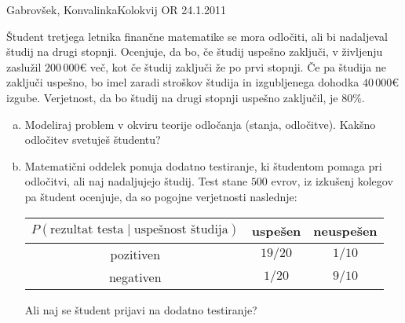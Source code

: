 \begin{naloga}{Gabrovšek, Konvalinka}{Kolokvij OR 24.1.2011}
\begin{vprasanje}
Študent tretjega letnika finančne matematike se mora odločiti,
ali bi nadaljeval študij na drugi stopnji.
Ocenjuje, da bo, če študij uspešno zaključi,
v življenju zaslužil $200\,000 €$ več,
kot če študij zaključi že po prvi stopnji.
Če pa študija ne zaključi uspešno,
bo imel zaradi stroškov študija in izgubljenega dohodka $40\,000 €$ izgube.
Verjetnost, da bo študij na drugi stopnji uspešno zaključil, je $80 \%$.
\begin{enumerate}[(a)]
\item Modeliraj problem v okviru teorije odločanja (stanja, odločitve).
Kakšno odločitev svetuješ študentu?

\item Matematični oddelek ponuja dodatno testiranje,
ki študentom pomaga pri odločitvi, ali naj nadaljujejo študij.
Test stane $500$ evrov,
iz izkušenj kolegov pa študent ocenjuje,
da so pogojne verjetnosti naslednje:
\begin{center}
\begin{tabular}{c|cc}
$P(\text{rezultat testa} \;|\; \text{uspešnost študija})$
& uspešen & neuspešen \\ \hline
pozitiven & $19/20$ & $1/10$ \\
negativen & $1/20$ & $9/10$
\end{tabular}
\end{center}
Ali naj se študent prijavi na dodatno testiranje?
\end{enumerate}
\end{vprasanje}
\begin{odgovor}
\end{odgovor}
\end{naloga}
